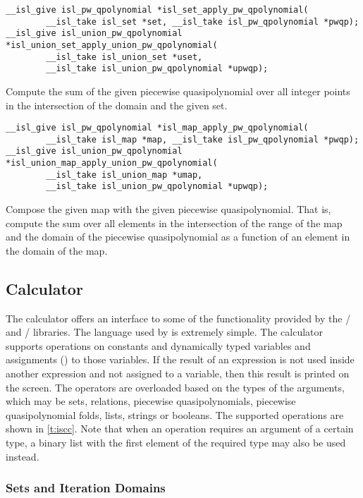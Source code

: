 \begin{verbatim}
__isl_give isl_pw_qpolynomial *isl_set_apply_pw_qpolynomial(
        __isl_take isl_set *set, __isl_take isl_pw_qpolynomial *pwqp);
__isl_give isl_union_pw_qpolynomial *isl_union_set_apply_union_pw_qpolynomial(
        __isl_take isl_union_set *uset,
        __isl_take isl_union_pw_qpolynomial *upwqp);
\end{verbatim}
Compute the sum of the given piecewise quasipolynomial over
all integer points in the intersection of the domain and the given set.

\begin{verbatim}
__isl_give isl_pw_qpolynomial *isl_map_apply_pw_qpolynomial(
        __isl_take isl_map *map, __isl_take isl_pw_qpolynomial *pwqp);
__isl_give isl_union_pw_qpolynomial *isl_union_map_apply_union_pw_qpolynomial(
        __isl_take isl_union_map *umap,
        __isl_take isl_union_pw_qpolynomial *upwqp);
\end{verbatim}
Compose the given map with the given piecewise quasipolynomial.
That is, compute the sum over all elements in the intersection
of the range of the map and the domain of the piecewise quasipolynomial
as a function of an element in the domain of the map.

\subsection{Calculator}

The  calculator offers an interface to some
of the functionality provided by the \isl/ and \barvinok/
libraries.
The language used by  is extremely simple.  The calculator
supports operations on constants and dynamically typed variables and
assignments (\ai[\tt]{:=}) to those variables.  If the result of an expression
is not used inside another expression and not assigned to a variable,
then this result is printed on the screen.  The operators are overloaded
based on the types of the arguments, which may be sets, relations,
piecewise quasipolynomials, piecewise quasipolynomial folds, lists,
strings or booleans.
The supported operations are shown in \autoref{t:iscc}.
Note that when an operation requires an argument of a certain
type, a binary list with the first element of the required type
may also be used instead.

\subsubsection{Sets and Iteration Domains}

